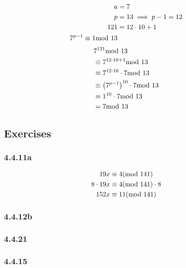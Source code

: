 \documentclass{article}
\begin{document}
\begin{align*}
	a   & = 7                      \\
	p   & = 13 \implies p - 1 = 12 \\
	121 & = 12 \cdot 10 + 1        \\
	7^{p - 1} \equiv 1 \text{mod } 13
\end{align*}
\begin{align*}
	 & 7^{121} \text{mod } 13                                      \\
	 & \equiv 7^{12 \cdot 10 + 1} \text{mod } 13                   \\
	 & \equiv 7^{12 \cdot 10} \cdot 7 \text{mod } 13               \\
	 & \equiv \left( 7^{p - 1} \right)^{10} \cdot 7 \text{mod } 13 \\
	 & \equiv 1^{10} \cdot 7 \text{mod } 13                        \\
	 & = 7 \text{mod } 13
\end{align*}

\subsection{Exercises}

\subsubsection{4.4.11a}

\begin{align*}
	19x         & \equiv 4(\text{mod } 141)         \\
	8 \cdot 19x & \equiv 4(\text{mod } 141) \cdot 8 \\
	152x        & \equiv 11(\text{mod } 141)        \\
\end{align*}

\subsubsection{4.4.12b}

\subsubsection{4.4.21}

\subsubsection{4.4.15}
\end{document}
